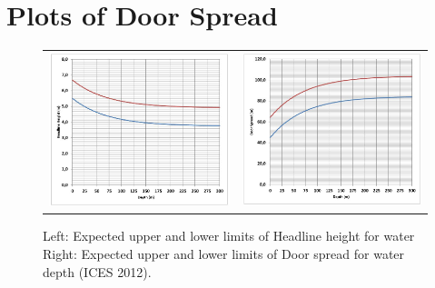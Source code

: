 \documentclass[a4paper 12pt]{article}
\numberwithin{equation}{section}
\begin{document}
\section{Plots of Door Spread}
\begin{figure}[h!]
\begin{tabular}{ll}
\includegraphics[scale=0.5]{headlineHeight.jpg}
&
\includegraphics[scale=0.5]{doorspead.jpg}
\end{tabular}
\caption{Left: Expected upper and lower limits of Headline height for water %
Right: Expected upper and lower limits of Door spread for water depth (ICES 2012).}
\label{fig:test}
\end{figure}
\end{document}
